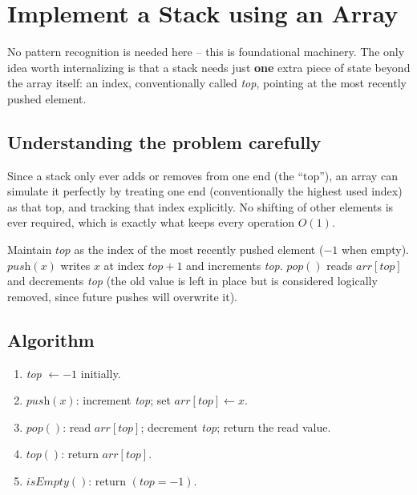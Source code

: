 \section{Implement a Stack using an Array}
\label{sec:sq-stack-array}


\begin{patternbox}
No pattern recognition is needed here -- this is foundational machinery.
The only idea worth internalizing is that a stack needs just \textbf{one}
extra piece of state beyond the array itself: an index, conventionally
called \textit{top}, pointing at the most recently pushed element.
\end{patternbox}

\subsection*{Understanding the problem carefully}

Since a stack only ever adds or removes from one end (the ``top''), an
array can simulate it perfectly by treating one end (conventionally the
highest used index) as that top, and tracking that index explicitly. No
shifting of other elements is ever required, which is exactly what keeps
every operation $O(1)$.

\begin{ideabox}
Maintain $\textit{top}$ as the index of the most recently pushed element
($-1$ when empty). $\textit{push}(x)$ writes $x$ at index $\textit{top}+1$
and increments \textit{top}. $\textit{pop}()$ reads $\textit{arr}
[\textit{top}]$ and decrements \textit{top} (the old value is left in
place but is considered logically removed, since future pushes will
overwrite it).
\end{ideabox}

\subsection*{Algorithm}

\begin{enumerate}
  \item \textit{top} $\gets -1$ initially.
  \item $\textit{push}(x)$: increment \textit{top}; set
        $\textit{arr}[\textit{top}] \gets x$.
  \item $\textit{pop}()$: read $\textit{arr}[\textit{top}]$; decrement
        \textit{top}; return the read value.
  \item $\textit{top}()$: return $\textit{arr}[\textit{top}]$.
  \item $\textit{isEmpty}()$: return $(\textit{top} = -1)$.
\end{enumerate}


